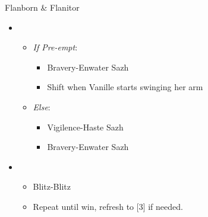 \documentclass{report}
\begin{document}
\begin{battle}{Flanborn \& Flanitor}
\begin{itemize}

    \item \first
    \begin{itemize}
    \item \textit{If Pre-empt}:
        \begin{itemize}
            \item Bravery-Enwater Sazh
            \item Shift when Vanille starts swinging her arm
        \end{itemize}
    \item \textit{Else}:
        \begin{itemize}
            \item Vigilence-Haste Sazh
            \item Bravery-Enwater Sazh
        \end{itemize}    
    \end{itemize}
    \item \sixth
    \begin{itemize}
        \item Blitz-Blitz
        \item Repeat until win, refresh to [3] if needed.
    \end{itemize}
\end{itemize}
 
\end{battle}
\end{document}
